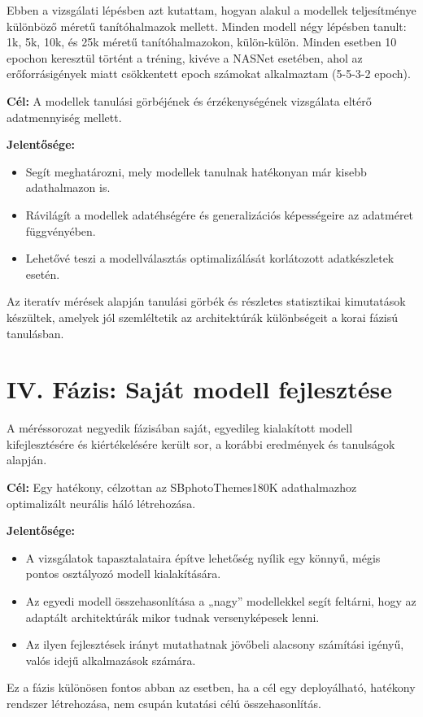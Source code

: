   Ebben a vizsgálati lépésben azt kutattam, hogyan alakul a modellek teljesítménye különböző méretű tanítóhalmazok mellett. Minden modell négy lépésben tanult: 1k, 5k, 10k, és 25k méretű tanítóhalmazokon, külön-külön. Minden esetben 10 epochon keresztül történt a tréning, kivéve a NASNet esetében, ahol az erőforrásigények miatt csökkentett epoch számokat alkalmaztam (5-5-3-2 epoch).
  
  \textbf{Cél:} A modellek tanulási görbéjének és érzékenységének vizsgálata eltérő adatmennyiség mellett.
  
  \textbf{Jelentősége:}
  \begin{itemize}
    \item Segít meghatározni, mely modellek tanulnak hatékonyan már kisebb adathalmazon is.
    \item Rávilágít a modellek adatéhségére és generalizációs képességeire az adatméret függvényében.
    \item Lehetővé teszi a modellválasztás optimalizálását korlátozott adatkészletek esetén.
  \end{itemize}
  
  Az iteratív mérések alapján tanulási görbék és részletes statisztikai kimutatások készültek, amelyek jól szemléltetik az architektúrák különbségeit a korai fázisú tanulásban.
  
  
  \section{IV. Fázis: Saját modell fejlesztése}
  
  A méréssorozat negyedik fázisában saját, egyedileg kialakított modell kifejlesztésére és kiértékelésére került sor, a korábbi eredmények és tanulságok alapján.
  
  \textbf{Cél:} Egy hatékony, célzottan az SBphotoThemes180K adathalmazhoz optimalizált neurális háló létrehozása.
  
  \textbf{Jelentősége:}
  \begin{itemize}
    \item A vizsgálatok tapasztalataira építve lehetőség nyílik egy könnyű, mégis pontos osztályozó modell kialakítására.
    \item Az egyedi modell összehasonlítása a „nagy” modellekkel segít feltárni, hogy az adaptált architektúrák mikor tudnak versenyképesek lenni.
    \item Az ilyen fejlesztések irányt mutathatnak jövőbeli alacsony számítási igényű, valós idejű alkalmazások számára.
  \end{itemize}
  
  Ez a fázis különösen fontos abban az esetben, ha a cél egy deployálható, hatékony rendszer létrehozása, nem csupán kutatási célú összehasonlítás.
  
  